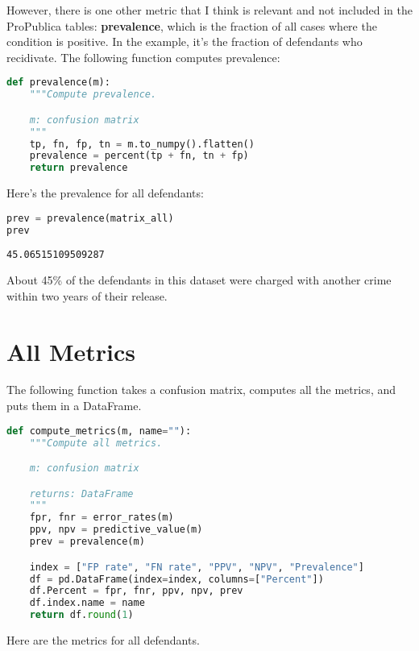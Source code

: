 However, there is one other metric that I think is relevant and not
included in the ProPublica tables: \textbf{prevalence}, which is the
fraction of all cases where the condition is positive. In the example,
it's the fraction of defendants who recidivate. The following function
computes prevalence:

\begin{lstlisting}[language=Python,style=source]
def prevalence(m):
    """Compute prevalence.

    m: confusion matrix
    """
    tp, fn, fp, tn = m.to_numpy().flatten()
    prevalence = percent(tp + fn, tn + fp)
    return prevalence
\end{lstlisting}

Here's the prevalence for all defendants:

\begin{lstlisting}[language=Python,style=source]
prev = prevalence(matrix_all)
prev
\end{lstlisting}

\begin{lstlisting}[style=output]
45.06515109509287
\end{lstlisting}

About 45\% of the defendants in this dataset were charged with another
crime within two years of their release.

\pagebreak

\section{All Metrics}\label{all-metrics}

The following function takes a confusion matrix, computes all the
metrics, and puts them in a DataFrame.

\begin{lstlisting}[language=Python,style=source]
def compute_metrics(m, name=""):
    """Compute all metrics.

    m: confusion matrix

    returns: DataFrame
    """
    fpr, fnr = error_rates(m)
    ppv, npv = predictive_value(m)
    prev = prevalence(m)

    index = ["FP rate", "FN rate", "PPV", "NPV", "Prevalence"]
    df = pd.DataFrame(index=index, columns=["Percent"])
    df.Percent = fpr, fnr, ppv, npv, prev
    df.index.name = name
    return df.round(1)
\end{lstlisting}

Here are the metrics for all defendants.

